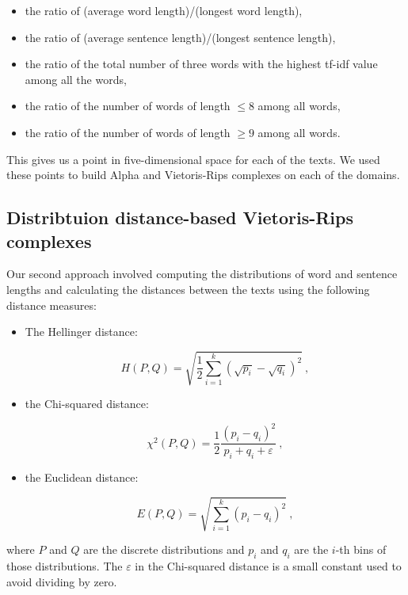 \documentclass[12pt,a4paper]{amsart}
\begin{document}
\begin{itemize}
  \item the ratio of (average word length)/(longest word length),
  \item the ratio of (average sentence length)/(longest sentence length),
  \item the ratio of the total number of three words with the highest tf-idf
    value among all the words,
  \item the ratio of the number of words of length $\le 8$ among all words,
  \item the ratio of the number of words of length $\ge 9$ among all words.
\end{itemize}

This gives us a point in five-dimensional space for each of the texts. We used
these points to build Alpha and Vietoris-Rips complexes on each of the domains.

\subsection{Distribtuion distance-based Vietoris-Rips complexes}

Our second approach involved computing the distributions of word and sentence
lengths and calculating the distances between the texts using the following
distance measures:

\begin{itemize}
\item The Hellinger distance:

\begin{equation*}
  H(P,Q) = \sqrt{\frac{1}{2} \sum_{i=1}^k\left(\sqrt{p_i} -
    \sqrt{q_i}\right)^2}\ ,
\end{equation*}

\item the Chi-squared distance:

\begin{equation*}
  \chi^2(P,Q) = \frac{1}{2} \frac{(p_i - q_i)^2}{p_i + q_i + \varepsilon}\ ,
\end{equation*}

\item the Euclidean distance:

\begin{equation*}
  E(P,Q) = \sqrt{\sum_{i=1}^k\left(p_i - q_i\right)^2}\ ,
\end{equation*}
\end{itemize}

\noindent
where $P$ and $Q$ are the discrete distributions and $p_i$ and $q_i$ are the
$i$-th bins of those distributions. The $\varepsilon$ in the Chi-squared
distance is a small constant used to avoid dividing by zero.
\end{document}
